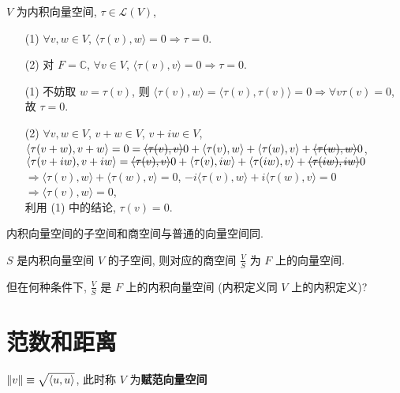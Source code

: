 \documentclass{note}
\begin{document}
\begin{thm}\label{thm-9.2}
    $V$ 为内积向量空间, $\tau\in\mathcal{L}(V)$,
    \begin{itemize}
        \item[(1)] $\forall v,w\in V$, $\langle\tau(v),w\rangle=0\Longrightarrow\tau=0$.
        \item[(2)] 对 $F=\mathbb{C}$, $\forall v\in V$, $\langle\tau(v),v\rangle=0\Longrightarrow\tau=0$.
    \end{itemize}
\end{thm}
\begin{pf}
    \begin{itemize}
        \item[(1)] 不妨取 $w=\tau(v)$, 则 $\langle\tau(v),w\rangle=\langle\tau(v),\tau(v)\rangle=0\Longrightarrow\forall v\tau(v)=0$, 故 $\tau=0$.
        \item[(2)] $\forall v,w\in V$, $v+w\in V$, $v+iw\in V$,\\
        $\langle\tau(v+w),v+w\rangle=0=\msout{\langle\tau(v),v\rangle}0+\langle\tau(v),w\rangle+\langle\tau(w),v\rangle+\msout{\langle\tau(w),w\rangle}0$, $\langle\tau(v+iw),v+iw\rangle=\msout{\langle\tau(v),v\rangle}0+\langle\tau(v),iw\rangle+\langle\tau(iw),v\rangle+\msout{\langle\tau(iw),iw\rangle}0$\\
        $\Longrightarrow\langle\tau(v),w\rangle+\langle\tau(w),v\rangle=0$, $-i\langle\tau(v),w\rangle+i\langle\tau(w),v\rangle=0$\\
        $\Longrightarrow\langle\tau(v),w\rangle=0$,\\
        利用 (1) 中的结论, $\tau(v)=0$.
    \end{itemize}
\end{pf}

内积向量空间的子空间和商空间与普通的向量空间同.

$S$ 是内积向量空间 $V$ 的子空间, 则对应的商空间 $\frac{V}{S}$ 为 $F$ 上的向量空间.

但在何种条件下, $\frac{V}{S}$ 是 $F$ 上的内积向量空间 (内积定义同 $V$ 上的内积定义)?

\section{范数和距离}
\begin{df}
    $\left\lVert v\right\rVert\equiv\sqrt{\langle u,u\rangle}$, 此时称 $V$ 为\textbf{赋范向量空间}
\end{df}
\end{document}
